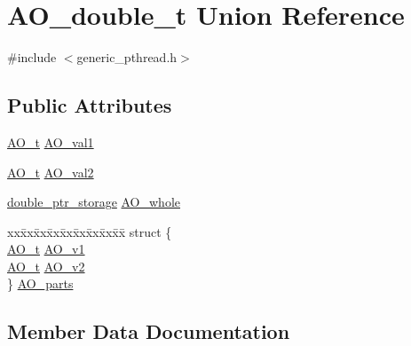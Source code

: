 \hypertarget{structAO__double__t}{}\section{A\+O\+\_\+double\+\_\+t Union Reference}
\label{structAO__double__t}


{\ttfamily \#include $<$generic\+\_\+pthread.\+h$>$}

\subsection*{Public Attributes}
\begin{DoxyCompactItemize}
\item 
\hyperlink{atomic__ops_8h_a5225fef4d9eee821e82382cd269160dd}{A\+O\+\_\+t} \hyperlink{structAO__double__t_a56db8737f0a8c2694329c400b7f94a80}{A\+O\+\_\+val1}
\item 
\hyperlink{atomic__ops_8h_a5225fef4d9eee821e82382cd269160dd}{A\+O\+\_\+t} \hyperlink{structAO__double__t_acc45c474c9a91a9f679adb12425a0257}{A\+O\+\_\+val2}
\item 
\hyperlink{standard__ao__double__t_8h_ac63c23baae3d771141f4660fbd1fbf7e}{double\+\_\+ptr\+\_\+storage} \hyperlink{structAO__double__t_a029ebe26b957e9b920c286705b24022a}{A\+O\+\_\+whole}
\item 
\begin{tabbing}
xx\=xx\=xx\=xx\=xx\=xx\=xx\=xx\=xx\=\kill
struct \{\\
\>\hyperlink{atomic__ops_8h_a5225fef4d9eee821e82382cd269160dd}{AO\_t} \hyperlink{structAO__double__t_a66b43922d540e66f680936a80c69c3c2}{AO\_v1}\\
\>\hyperlink{atomic__ops_8h_a5225fef4d9eee821e82382cd269160dd}{AO\_t} \hyperlink{structAO__double__t_acf8e7ff92420bc60c4bdd12aa528151b}{AO\_v2}\\
\} \hyperlink{structAO__double__t_af71891b71113270b6904d1946078af0f}{AO\_parts}\\

\end{tabbing}\end{DoxyCompactItemize}


\subsection{Member Data Documentation}
\mbox{\label{structAO__double__t_af71891b71113270b6904d1946078af0f}} 
